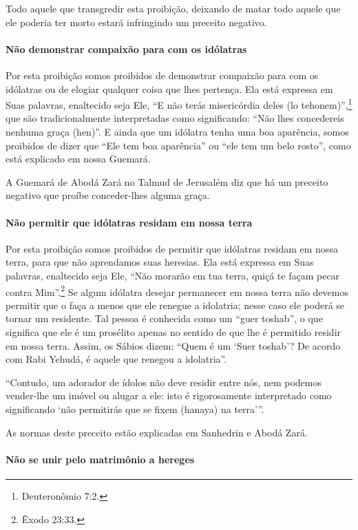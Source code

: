 Todo aquele que transgredir esta proibição, deixando de matar todo
aquele que ele poderia ter morto estará infringindo um preceito
negativo.

\paragraph{Não demonstrar compaixão para com os idólatras}

Por esta proibição somos proibidos de demonstrar compaixão para com os
idólatras ou de elogiar qualquer coisa que lhes pertença. Ela está
expressa em Suas palavras, enaltecido seja Ele, ``E não terás
misericórdia deles (lo tehonem)'',\footnote{Deuteronômio 7:2.} que são
tradicionalmente interpretadas como significando: ``Não lhes
concedereis nenhuma graça (hen)''. E ainda que um idólatra tenha uma boa
aparência, somos proibidos de dizer que ``Ele tem boa aparência'' ou
``ele tem um belo rosto'', como está explicado em nossa Guemará.

A Guemará de Abodá Zará no Talmud de Jerusalém diz que há um preceito
negativo que proíbe conceder-lhes alguma graça.

\paragraph{Não permitir que idólatras residam em nossa terra}

Por esta proibição somos proibidos de permitir que idólatras residam em
nossa terra, para que não aprendamos suas heresias. Ela está expressa em
Suas palavras, enaltecido seja Ele, ``Não morarão em tua terra, quiçá te
façam pecar contra Mim''.\footnote{Êxodo 23:33.} Se algum idólatra desejar
permanecer em nossa terra não devemos permitir que o faça a menos que
ele renegue a idolatria; nesse caso ele poderá se tornar um residente.
Tal pessoa é conhecida como um ``guer toshab'', o que significa que ele
é um prosélito apenas no sentido de que lhe é permitido residir em
nossa terra. Assim, os Sábios dizem: ``Quem é um `Suer toshab'? De
acordo com Rabi Yehudá, é aquele que renegou a idolatria''.

``Contudo, um adorador de ídolos não deve residir entre nós, nem podemos
vender-lhe um imóvel ou alugar a ele: isto é rigorosamente interpretado
como significando `não permitirás que se fixem (hanaya) na terra'''.

As normas deste preceito estão explicadas em Sanhedrin e Abodá Zará.

\paragraph{Não se unir pelo matrimônio a hereges}


